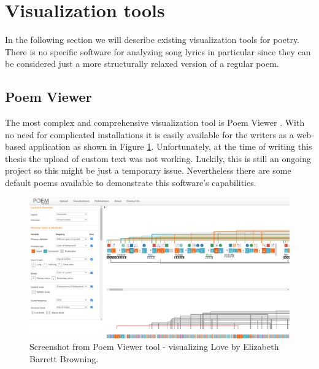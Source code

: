 \section{Visualization tools}
In the following section we will describe existing visualization tools for poetry. There is no specific software for analyzing song lyrics in particular since they can be considered just a more structurally relaxed version of a regular poem.
\subsection{Poem Viewer}
The most complex and comprehensive visualization tool is Poem Viewer \cite{Abdul2013}. With no need for complicated installations it is easily available for the writers as a web-based application as shown in Figure \ref{screenshotPV}. Unfortunately, at the time of writing this thesis the upload of custom text was not working. Luckily, this is still an ongoing project so this might be just a temporary issue. Nevertheless there are some default poems available to demonstrate this software's capabilities.
\begin{figure}[h]\centering
	\includegraphics[scale=0.24]{../img/ScreenshotPV.png}
	\caption{Screenshot from Poem Viewer tool - visualizing Love by Elizabeth Barrett Browning.}\label{screenshotPV}
\end{figure}

